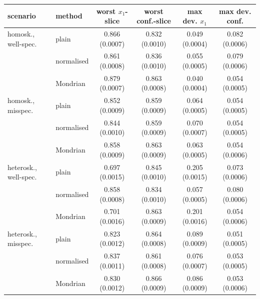 \begin{tabular}{llcccc}
\toprule
scenario & method & worst $x_1$-slice & worst conf.-slice & max dev. $x_1$ & max dev. conf. \\
\midrule
homosk., well-spec. & plain & 0.866 (0.0007) & 0.832 (0.0010) & 0.049 (0.0004) & 0.082 (0.0006) \\
 & normalised & 0.861 (0.0008) & 0.836 (0.0010) & 0.055 (0.0005) & 0.079 (0.0006) \\
 & Mondrian & 0.879 (0.0007) & 0.863 (0.0008) & 0.040 (0.0004) & 0.054 (0.0005) \\
\midrule
homosk., misspec. & plain & 0.852 (0.0009) & 0.859 (0.0009) & 0.064 (0.0005) & 0.054 (0.0005) \\
 & normalised & 0.844 (0.0010) & 0.859 (0.0009) & 0.070 (0.0007) & 0.054 (0.0005) \\
 & Mondrian & 0.858 (0.0009) & 0.863 (0.0009) & 0.063 (0.0005) & 0.054 (0.0006) \\
\midrule
heterosk., well-spec. & plain & 0.697 (0.0015) & 0.845 (0.0010) & 0.205 (0.0015) & 0.073 (0.0006) \\
 & normalised & 0.858 (0.0008) & 0.834 (0.0010) & 0.057 (0.0005) & 0.080 (0.0006) \\
 & Mondrian & 0.701 (0.0016) & 0.863 (0.0009) & 0.201 (0.0016) & 0.054 (0.0006) \\
\midrule
heterosk., misspec. & plain & 0.823 (0.0012) & 0.864 (0.0008) & 0.089 (0.0009) & 0.051 (0.0005) \\
 & normalised & 0.837 (0.0011) & 0.861 (0.0008) & 0.076 (0.0007) & 0.053 (0.0005) \\
 & Mondrian & 0.830 (0.0012) & 0.866 (0.0009) & 0.086 (0.0009) & 0.053 (0.0006) \\
\bottomrule
\end{tabular}
